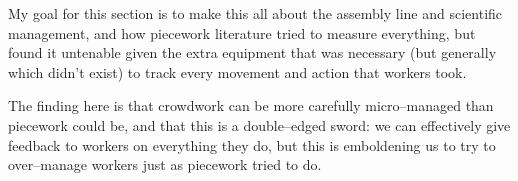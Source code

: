 \documentclass[trackingWork]{subfiles}
\begin{document}
{
My goal for this section is to make this all about the assembly line and
scientific management, and how piecework literature tried to measure everything,
but found it untenable given the extra equipment that was necessary
(but generally which didn't exist) to track every movement and action that workers took.

The finding here is that
crowdwork can be more carefully micro--managed than piecework could be,
and that this is a double--edged sword:
we can effectively give feedback to workers on everything they do,
but this is emboldening us to try to
over--manage workers just as piecework tried to do.}





\onlyinsubfile{
  \printbibliography
}
\end{document}
